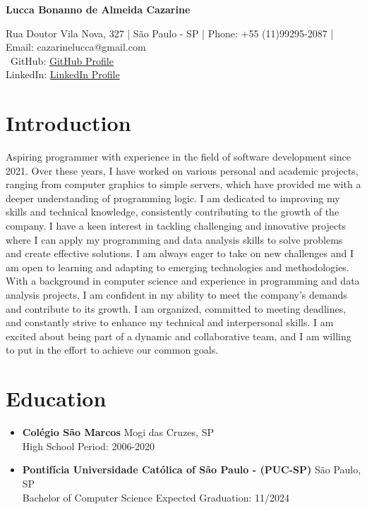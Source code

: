 \documentclass[a4paper,10pt]{article}
\begin{document}
\begin{center}
    \textbf{\Large Lucca Bonanno de Almeida Cazarine}
\end{center}

\begin{center}
 Rua Doutor Vila Nova, 327 | São Paulo - SP | Phone: +55 (11)99295-2087 | Email: cazarinelucca@gmail.com \\\
 GitHub: \href{https://github.com/LuccaCazarine}{GitHub Profile} \\
 LinkedIn: \href{https://www.linkedin.com/in/lucca-cazarine/}{LinkedIn Profile}   
\end{center}

\section*{Introduction}
Aspiring programmer with experience in the field of software development since 2021. Over these years, I have worked on various personal and academic projects, ranging from computer graphics to simple servers, which have provided me with a deeper understanding of programming logic. I am dedicated to improving my skills and technical knowledge, consistently contributing to the growth of the company. I have a keen interest in tackling challenging and innovative projects where I can apply my programming and data analysis skills to solve problems and create effective solutions. I am always eager to take on new challenges and I am open to learning and adapting to emerging technologies and methodologies. With a background in computer science and experience in programming and data analysis projects, I am confident in my ability to meet the company's demands and contribute to its growth. I am organized, committed to meeting deadlines, and constantly strive to enhance my technical and interpersonal skills. I am excited about being part of a dynamic and collaborative team, and I am willing to put in the effort to achieve our common goals.

\section*{Education}
\begin{itemize}[leftmargin=*]
    \item \textbf{Colégio São Marcos} \hfill Mogi das Cruzes, SP \\
    High School \hfill Period: 2006-2020
    \item \textbf{Pontifícia Universidade Católica of São Paulo - (PUC-SP)} \hfill São Paulo, SP \\
    Bachelor of Computer Science \hfill Expected Graduation: 11/2024
\end{itemize}
\end{document}
